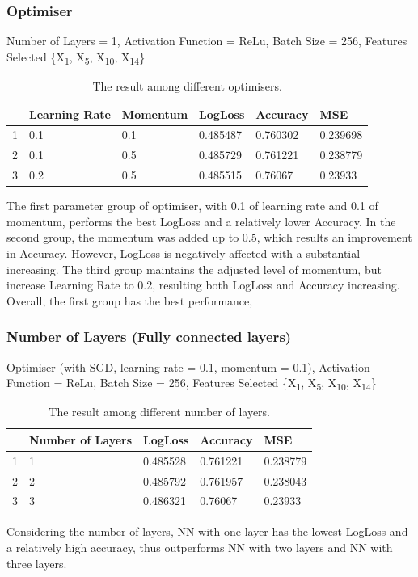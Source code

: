 \documentclass[
10pt, %
a4paper, %
oneside, %
headinclude,footinclude, %
BCOR5mm, %
]{scrartcl}
\begin{document}
\subsubsection{Optimiser}
Number of Layers = 1, Activation Function = ReLu, Batch Size = 256, Features Selected \{X\textsubscript{1}, X\textsubscript{5}, X\textsubscript{10}, X\textsubscript{14}\}
\begin{table}[H]
\centering
\caption{The result among different optimisers.}
\label{my-label}
\begin{tabular}{|l|l|l|l|l|l|}
\hline
 & \textbf{Learning Rate} & \textbf{Momentum} & \textbf{LogLoss} & \textbf{Accuracy} & \textbf{MSE} \\ \hline
1 & 0.1 & 0.1 & 0.485487 & 0.760302 & 0.239698 \\ \hline
2 & 0.1 & 0.5 & 0.485729 & 0.761221 & 0.238779 \\ \hline
3 & 0.2 & 0.5 & 0.485515 & 0.76067 & 0.23933 \\ \hline
\end{tabular}
\end{table}
The first parameter group of optimiser, with 0.1 of learning rate and 0.1 of momentum, performs the best LogLoss and a relatively lower Accuracy. In the second group, the momentum was added up to 0.5, which results an improvement in Accuracy. However, LogLoss is negatively affected with a substantial increasing. The third group maintains the adjusted level of momentum, but increase Learning Rate to 0.2, resulting both LogLoss and Accuracy increasing. Overall, the first group has the best performance,
\subsubsection{Number of Layers (Fully connected layers)}
Optimiser (with SGD, learning rate = 0.1, momentum = 0.1), Activation Function = ReLu, Batch Size = 256, Features Selected \{X\textsubscript{1}, X\textsubscript{5}, X\textsubscript{10}, X\textsubscript{14}\}
\begin{table}[H]
\centering
\caption{The result among different number of layers.}
\label{my-label}
\begin{tabular}{|l|l|l|l|l|}
\hline
 & \textbf{Number of Layers} & \textbf{LogLoss} & \textbf{Accuracy} & \textbf{MSE} \\ \hline
1 & 1 & 0.485528 & 0.761221 & 0.238779 \\ \hline
2 & 2 & 0.485792 & 0.761957 & 0.238043 \\ \hline
3 & 3 & 0.486321 & 0.76067 & 0.23933 \\ \hline
\end{tabular}
\end{table}
Considering the number of layers, NN with one layer has the lowest LogLoss and a relatively high accuracy, thus outperforms NN with two layers and NN with three layers.
\end{document}
